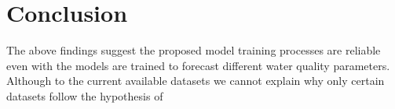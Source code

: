 \chapter{Conclusion}


The above findings suggest the proposed model training processes are reliable even with the models are trained to forecast different water quality parameters. Although to the current available datasets we cannot explain why only certain datasets follow the hypothesis of 